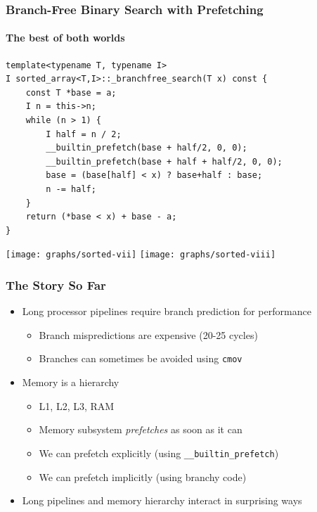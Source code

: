 \documentclass[xcolor=dvipsnames]{beamer}
\begin{document}
\begin{frame}[fragile]
   \frametitle{Branch-Free Binary Search with Prefetching}
   \framesubtitle{The best of both worlds}

   {\tiny
   \begin{verbatim}
template<typename T, typename I>
I sorted_array<T,I>::_branchfree_search(T x) const {
    const T *base = a;
    I n = this->n;
    while (n > 1) {
        I half = n / 2;
        __builtin_prefetch(base + half/2, 0, 0);
        __builtin_prefetch(base + half + half/2, 0, 0);
        base = (base[half] < x) ? base+half : base;
        n -= half;
    }
    return (*base < x) + base - a;
}
   \end{verbatim}
   }
   \texttt{[image: graphs/sorted-vii]}
   \texttt{[image: graphs/sorted-viii]}

\end{frame}

\begin{frame}[fragile]
   \frametitle{The Story So Far}

   \begin{itemize}
      \item<+->Long processor pipelines require branch prediction
               for performance
      \begin{itemize}
         \item<+->Branch mispredictions are expensive (20-25 cycles)
         \item<+->Branches can sometimes be avoided using 
                  \texttt{cmov}
      \end{itemize}
      \item<+->Memory is a hierarchy
      \begin{itemize}
         \item<+->L1, L2, L3, RAM%
            \only<+->{,\ldots}
         \item<+->Memory subsystem \emph{prefetches} as soon as it can
         \item<+->We can prefetch explicitly (using \texttt{__builtin_prefetch})
         \item<+->We can prefetch implicitly (using branchy code)
      \end{itemize}
      \item<+->Long pipelines and memory hierarchy interact in surprising
               ways
   \end{itemize}
\end{frame}
\end{document}
